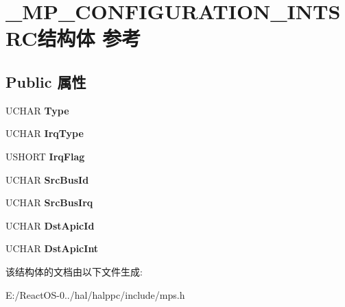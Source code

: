 \hypertarget{struct___m_p___c_o_n_f_i_g_u_r_a_t_i_o_n___i_n_t_s_r_c}{}\section{\+\_\+\+M\+P\+\_\+\+C\+O\+N\+F\+I\+G\+U\+R\+A\+T\+I\+O\+N\+\_\+\+I\+N\+T\+S\+R\+C结构体 参考}
\label{struct___m_p___c_o_n_f_i_g_u_r_a_t_i_o_n___i_n_t_s_r_c}
\subsection*{Public 属性}
\begin{DoxyCompactItemize}
\item 
\mbox{\label{struct___m_p___c_o_n_f_i_g_u_r_a_t_i_o_n___i_n_t_s_r_c_a828e7fb9b36c9b6e81dc0ae6fb799f89}} 
U\+C\+H\+AR {\bfseries Type}
\item 
\mbox{\label{struct___m_p___c_o_n_f_i_g_u_r_a_t_i_o_n___i_n_t_s_r_c_a8708979805cc3841ccdd93a87e206d6a}} 
U\+C\+H\+AR {\bfseries Irq\+Type}
\item 
\mbox{\label{struct___m_p___c_o_n_f_i_g_u_r_a_t_i_o_n___i_n_t_s_r_c_a7c0b78113b23cc0a7810ac53fdb1fa3b}} 
U\+S\+H\+O\+RT {\bfseries Irq\+Flag}
\item 
\mbox{\label{struct___m_p___c_o_n_f_i_g_u_r_a_t_i_o_n___i_n_t_s_r_c_ae716a72cd1bde6f9ae5ad943d40f24e3}} 
U\+C\+H\+AR {\bfseries Src\+Bus\+Id}
\item 
\mbox{\label{struct___m_p___c_o_n_f_i_g_u_r_a_t_i_o_n___i_n_t_s_r_c_a50333b03692e2c9b423e402e3fc15c50}} 
U\+C\+H\+AR {\bfseries Src\+Bus\+Irq}
\item 
\mbox{\label{struct___m_p___c_o_n_f_i_g_u_r_a_t_i_o_n___i_n_t_s_r_c_adf97ab9f2ec9c50918bba2d46e1fa8a3}} 
U\+C\+H\+AR {\bfseries Dst\+Apic\+Id}
\item 
\mbox{\label{struct___m_p___c_o_n_f_i_g_u_r_a_t_i_o_n___i_n_t_s_r_c_aa2ba20ed173edc53d3e62e11eb1856ba}} 
U\+C\+H\+AR {\bfseries Dst\+Apic\+Int}
\end{DoxyCompactItemize}


该结构体的文档由以下文件生成\+:\begin{DoxyCompactItemize}
\item 
E\+:/\+React\+O\+S-\/0../hal/halppc/include/mps.\+h\end{DoxyCompactItemize}
